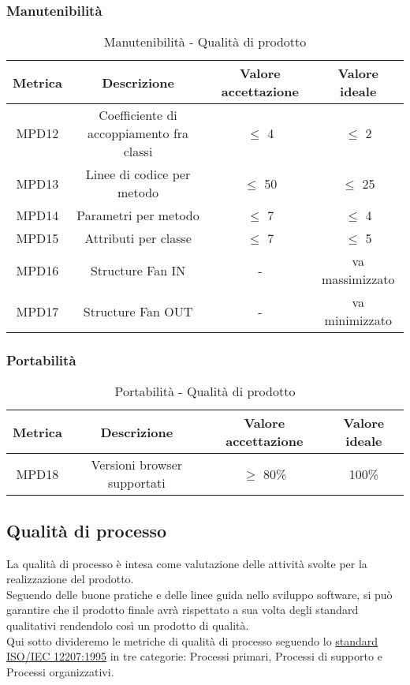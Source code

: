 \documentclass[10pt]{article}
\begin{document}
\begin{justify}
\subsubsection{Manutenibilità}
\begin{table}[H]
  \centering
\begin{tabular}{|c|c|c|c|}
  \hline
  \textbf{Metrica} & \textbf{Descrizione} & \textbf{Valore accettazione} & \textbf{Valore ideale}\\
  \hline
  MPD12 & Coefficiente di accoppiamento fra classi & $\leq$ 4 & $\leq$ 2 \\
  \hline
  MPD13 & Linee di codice per metodo & $\leq$ 50 & $\leq$ 25 \\
  \hline
  MPD14 & Parametri per metodo & $\leq$ 7 & $\leq$ 4 \\
  \hline
  MPD15 & Attributi per classe & $\leq$ 7 & $\leq$ 5 \\
  \hline
  MPD16 & Structure Fan IN & - & va massimizzato \\
  \hline
  MPD17 & Structure Fan OUT & - & va minimizzato \\
  \hline
\end{tabular}
\caption{Manutenibilità - Qualità di prodotto}
\label{tab:manutenibilità}
\end{table}

\subsubsection{Portabilità}
\begin{table}[H]
  \centering
\begin{tabular}{|c|c|c|c|}
  \hline
  \textbf{Metrica} & \textbf{Descrizione} & \textbf{Valore accettazione} & \textbf{Valore ideale}\\
  \hline
  MPD18 & Versioni browser supportati & $\geq$ 80\% & 100\% \\
  \hline
\end{tabular}
\caption{Portabilità - Qualità di prodotto}
\label{tab:portabilità}
\end{table}


\subsection{Qualità di processo}
La qualità di processo è intesa come valutazione delle attività svolte per la realizzazione del prodotto.\\
Seguendo delle buone pratiche e delle linee guida nello sviluppo software, si può garantire che il prodotto finale avrà rispettato a sua volta degli standard qualitativi rendendolo così un prodotto di qualità.\\
Qui sotto divideremo le metriche di qualità di processo seguendo lo \hyperref[ISO 12207:1995]{standard ISO/IEC 12207:1995} in tre categorie: Processi primari, Processi di supporto e Processi organizzativi.\\

\end{justify}
\end{document}
